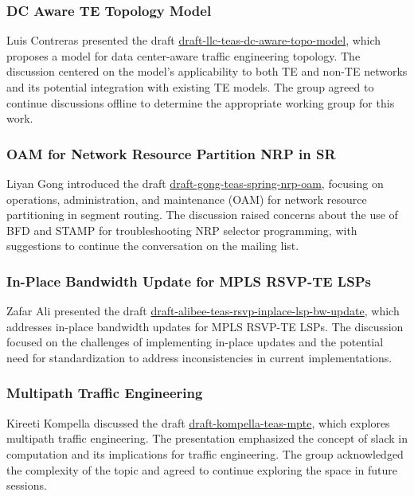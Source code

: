 \documentclass{article}
\begin{document}
\subsubsection{DC Aware TE Topology Model}
Luis Contreras presented the draft \href{https://datatracker.ietf.org/doc/draft-llc-teas-dc-aware-topo-model/04}{draft-llc-teas-dc-aware-topo-model}, which proposes a model for data center-aware traffic engineering topology. The discussion centered on the model's applicability to both TE and non-TE networks and its potential integration with existing TE models. The group agreed to continue discussions offline to determine the appropriate working group for this work.

\subsubsection{OAM for Network Resource Partition NRP in SR}
Liyan Gong introduced the draft \href{https://datatracker.ietf.org/doc/draft-gong-teas-spring-nrp-oam/00/}{draft-gong-teas-spring-nrp-oam}, focusing on operations, administration, and maintenance (OAM) for network resource partitioning in segment routing. The discussion raised concerns about the use of BFD and STAMP for troubleshooting NRP selector programming, with suggestions to continue the conversation on the mailing list.

\subsubsection{In-Place Bandwidth Update for MPLS RSVP-TE LSPs}
Zafar Ali presented the draft \href{https://datatracker.ietf.org/doc/draft-alibee-teas-rsvp-inplace-lsp-bw-update/01/}{draft-alibee-teas-rsvp-inplace-lsp-bw-update}, which addresses in-place bandwidth updates for MPLS RSVP-TE LSPs. The discussion focused on the challenges of implementing in-place updates and the potential need for standardization to address inconsistencies in current implementations.

\subsubsection{Multipath Traffic Engineering}
Kireeti Kompella discussed the draft \href{https://datatracker.ietf.org/doc/draft-kompella-teas-mpte/00/}{draft-kompella-teas-mpte}, which explores multipath traffic engineering. The presentation emphasized the concept of slack in computation and its implications for traffic engineering. The group acknowledged the complexity of the topic and agreed to continue exploring the space in future sessions.
\end{document}
